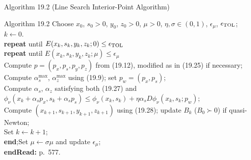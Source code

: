 \documentclass[aspectratio=169,12pt]{beamer}
\newcommand{\la}{\leftarrow}
\newcommand{\readbook}[1]{{\color{red}\textbf{Read:} #1}}
\begin{document}
\begin{frame}{Algorithm 19.2 (Line Search Interior-Point Algorithm)}
  \begin{block}{Algorithm 19.2}\small
    Choose $x_{0}$, $s_{0}>0$, $y_{0}$, $z_{0}>0$, $\mu>0$, $\eta,\sigma\in(0,1)$, $\epsilon_{\mu}$, $\epsilon_{\rm TOL}$; $k\la 0$.\\
    \textbf{repeat} until $E(x_{k},s_{k},y_{k},z_{k};0)\le\epsilon_{\rm TOL}$\\
    \quad\textbf{repeat} until $E(x_{k},s_{k},y_{k},z_{k};\mu)\le\epsilon_{\mu}$\\
    \qquad Compute $p=(p_{x},p_{s},p_{y},p_{z})$ from (19.12), modified as in (19.25) if necessary;\\
    \qquad Compute $\alpha_{s}^{\max}$, $\alpha_{z}^{\max}$ using (19.9); set $p_{w}=(p_{x},p_{s})$;\\
    \qquad Compute $\alpha_{s}$, $\alpha_{z}$ satisfying both (19.27) and\\
    \qquad\qquad $\phi_{\nu}(x_{k}+\alpha_{s}p_{x},s_{k}+\alpha_{s}p_{s})\le\phi_{\nu}(x_{k},s_{k})+\eta\alpha_{s}D\phi_{\nu}(x_{k},s_{k};p_{w})$;\\
    \qquad Compute $(x_{k+1},s_{k+1},y_{k+1},z_{k+1})$ using (19.28); update $B_{k}$ ($B_{0}\succ 0$) if quasi-Newton;\\
    \qquad Set $k\la k+1$;\\
    \quad\textbf{end};\quad Set $\mu\la\sigma\mu$ and update $\epsilon_{\mu}$;\\
    \textbf{end}\hfill\readbook{p.~577.}
  \end{block}
\end{frame}
\end{document}
